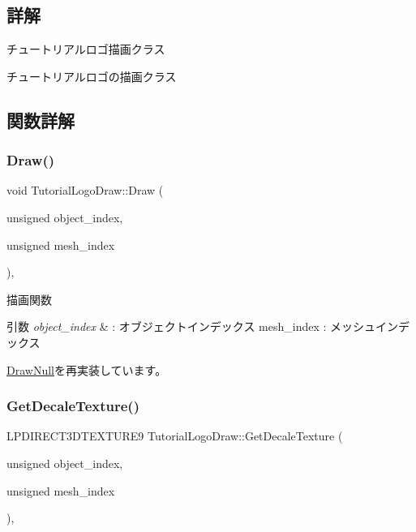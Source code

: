 \subsection{詳解}
チュートリアルロゴ描画クラス 

チュートリアルロゴの描画クラス 

\subsection{関数詳解}
\mbox{\label{class_tutorial_logo_draw_aa808cfb8bc59d58bbd698a195603429f}} 
\subsubsection{\texorpdfstring{Draw()}{Draw()}}
{\footnotesize\ttfamily void Tutorial\+Logo\+Draw\+::\+Draw (\begin{DoxyParamCaption}\item[{unsigned}]{object\+\_\+index,  }\item[{unsigned}]{mesh\+\_\+index }\end{DoxyParamCaption})\hspace{0.3cm}{\ttfamily [override]}, {\ttfamily [virtual]}}



描画関数 


\begin{DoxyParams}{引数}
{\em object\+\_\+index} & \+: オブジェクトインデックス mesh\+\_\+index \+: メッシュインデックス \\
\hline
\end{DoxyParams}


\mbox{\hyperlink{class_draw_null_afe50f6fd820b18d673f70f048743f339}{Draw\+Null}}を再実装しています。

\mbox{\label{class_tutorial_logo_draw_ad9df98aa8a5b11872dba6f6609589035}} 
\subsubsection{\texorpdfstring{Get\+Decale\+Texture()}{GetDecaleTexture()}}
{\footnotesize\ttfamily L\+P\+D\+I\+R\+E\+C\+T3\+D\+T\+E\+X\+T\+U\+R\+E9 Tutorial\+Logo\+Draw\+::\+Get\+Decale\+Texture (\begin{DoxyParamCaption}\item[{unsigned}]{object\+\_\+index,  }\item[{unsigned}]{mesh\+\_\+index }\end{DoxyParamCaption})\hspace{0.3cm}{\ttfamily [override]}, {\ttfamily [virtual]}}



